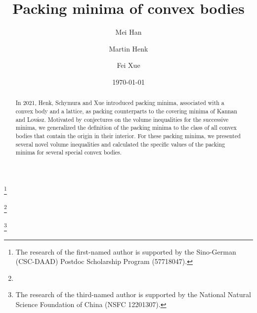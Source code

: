 \documentclass{amsart}
\theoremstyle{definition}
\theoremstyle{remark}
\numberwithin{equation}{section}
\begin{document}
\title{Packing minima of convex bodies}


\author{Mei Han}
\address{Institut f{\"u}r Mathematik, Technische Universit{\"a}t Berlin, Berlin, Germany}
\curraddr{}
\thanks{The research of the first-named author is supported by the Sino-German (CSC-DAAD) Postdoc Scholarship Program (57718047).}

\author{Martin Henk}
\address{Institut f{\"u}r Mathematik, Technische Universit{\"a}t Berlin, Berlin, Germany}
\curraddr{}
\thanks{}

\author{Fei Xue}
\address{Institute of Mathematics, School of Mathematical Sciences, Nanjing Normal University, Nanjing, China}
\curraddr{}
\thanks{The research of the third-named author is supported by the National Natural Science Foundation of China (NSFC 12201307).}



\date{\today}

\dedicatory{}

\begin{abstract} In 2021, Henk, Schymura and Xue introduced packing minima, associated with a convex body and a lattice, as packing counterparts to the covering minima of Kannan and Lov{\'a}sz. Motivated by conjectures on the volume inequalities for the successive minima, we generalized the definition of the packing minima to the class of all convex bodies that contain the origin in their interior. For these packing minima, we presented several novel volume inequalities and calculated the specific values of the packing minima for several special convex bodies. 
\end{abstract}

\maketitle
\end{document}
